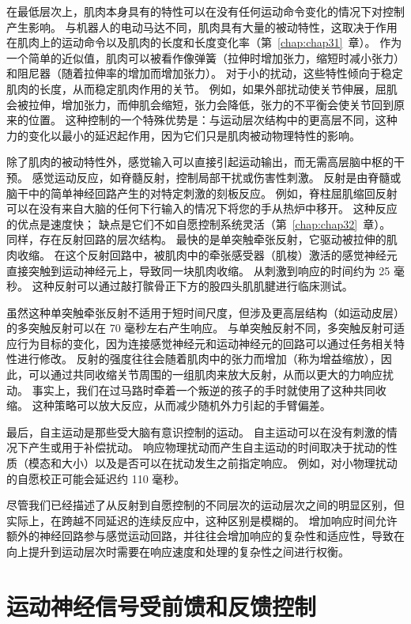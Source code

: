 在最低层次上，肌肉本身具有的特性可以在没有任何运动命令变化的情况下对控制产生影响。
与机器人的电动马达不同，肌肉具有大量的被动特性，这取决于作用在肌肉上的运动命令以及肌肉的长度和长度变化率（第~\ref{chap:chap31}~章）。
作为一个简单的近似值，肌肉可以被看作像弹簧（拉伸时增加张力，缩短时减小张力）和阻尼器（随着拉伸率的增加而增加张力）。
对于小的扰动，这些特性倾向于稳定肌肉的长度，从而稳定肌肉作用的关节。
例如，如果外部扰动使关节伸展，屈肌会被拉伸，增加张力，而伸肌会缩短，张力会降低，张力的不平衡会使关节回到原来的位置。
这种控制的一个特殊优势是：与运动层次结构中的更高层不同，这种力的变化以最小的延迟起作用，因为它们只是肌肉被动物理特性的影响。


除了肌肉的被动特性外，感觉输入可以直接引起运动输出，而无需高层脑中枢的干预。
感觉运动反应，如脊髓反射，控制局部干扰或伤害性刺激。
反射是由脊髓或脑干中的简单神经回路产生的对特定刺激的刻板反应。
例如，脊柱屈肌缩回反射可以在没有来自大脑的任何下行输入的情况下将您的手从热炉中移开。
这种反应的优点是速度快；
缺点是它们不如自愿控制系统灵活（第~\ref{chap:chap32}~章）。
同样，存在反射回路的层次结构。
最快的是单突触牵张反射，它驱动被拉伸的肌肉收缩。 
在这个反射回路中，被肌肉中的牵张感受器（肌梭）激活的感觉神经元直接突触到运动神经元上，导致同一块肌肉收缩。
从刺激到响应的时间约为 25 毫秒。
这种反射可以通过敲打髌骨正下方的股四头肌肌腱进行临床测试。


虽然这种单突触牵张反射不适用于短时间尺度，但涉及更高层结构（如运动皮层）的多突触反射可以在 70 毫秒左右产生响应。
与单突触反射不同，多突触反射可适应行为目标的变化，因为连接感觉神经元和运动神经元的回路可以通过任务相关特性进行修改。
反射的强度往往会随着肌肉中的张力而增加（称为增益缩放），因此，可以通过共同收缩关节周围的一组肌肉来放大反射，从而以更大的力响应扰动。
事实上，我们在过马路时牵着一个叛逆的孩子的手时就使用了这种共同收缩。
这种策略可以放大反应，从而减少随机外力引起的手臂偏差。


最后，自主运动是那些受大脑有意识控制的运动。
自主运动可以在没有刺激的情况下产生或用于补偿扰动。
响应物理扰动而产生自主运动的时间取决于扰动的性质（模态和大小）以及是否可以在扰动发生之前指定响应。
例如，对小物理扰动的自愿校正可能会延迟约 110 毫秒。


尽管我们已经描述了从反射到自愿控制的不同层次的运动层次之间的明显区别，但实际上，在跨越不同延迟的连续反应中，这种区别是模糊的。
增加响应时间允许额外的神经回路参与感觉运动回路，并往往会增加响应的复杂性和适应性，导致在向上提升到运动层次时需要在响应速度和处理的复杂性之间进行权衡。



\section{运动神经信号受前馈和反馈控制}

